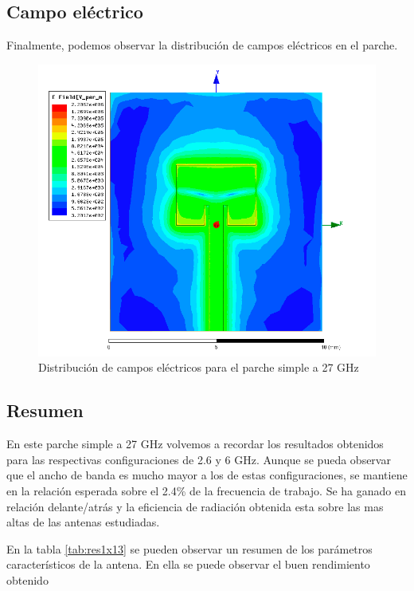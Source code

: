\newpage
\subsection{Campo eléctrico}
\par Finalmente, podemos observar la distribución de campos eléctricos en el parche. 

\begin{figure}[H]
    \centering
        \includegraphics[width=\textwidth]{archivos/analisis/1x13/8}
        \caption{Distribución de campos eléctricos para el parche simple a 27 GHz}
        \label{fig:elec1x13}
\end{figure}


\subsection{Resumen}
\par En este parche simple a 27 GHz volvemos a recordar los resultados obtenidos para las respectivas configuraciones de 2.6 y 6 GHz. Aunque se pueda observar que el ancho de banda es mucho mayor a los de estas configuraciones, se mantiene en la relación esperada sobre el 2.4\% de la frecuencia de trabajo. Se ha ganado en relación delante/atrás y la eficiencia de radiación obtenida esta sobre las mas altas de las antenas estudiadas. 
\\
\par En la tabla \ref{tab:res1x13} se pueden observar un resumen de los parámetros característicos de la antena. En ella se puede observar el buen rendimiento obtenido

